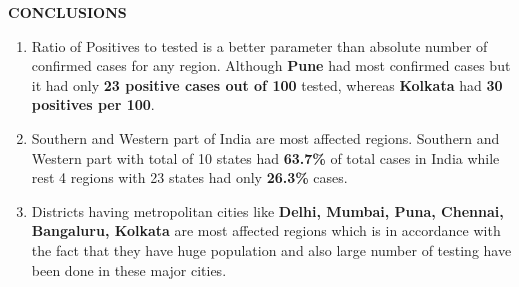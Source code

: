 \documentclass[12pt]{article}
\begin{document}
\textbf{CONCLUSIONS}
\begin{enumerate}
    \item Ratio of Positives to tested is a better parameter than absolute number of confirmed cases for any region. Although \textbf{Pune} had most confirmed cases but it had only \textbf{23 positive cases out of 100} tested, whereas \textbf{Kolkata} had \textbf{30 positives per 100}.
    
    \item Southern and Western part of India are most affected regions.
    Southern and Western part with total of 10 states had \textbf{63.7\%} of total cases in India while rest 4 regions with 23 states had only \textbf{26.3\%} cases.
    
    \item Districts having metropolitan cities like \textbf{Delhi, Mumbai, Puna, Chennai, Bangaluru, Kolkata} are most affected regions which is in accordance with the fact that they have huge population and also large number of testing have been done in these major cities.
\end{enumerate}
\end{document}
